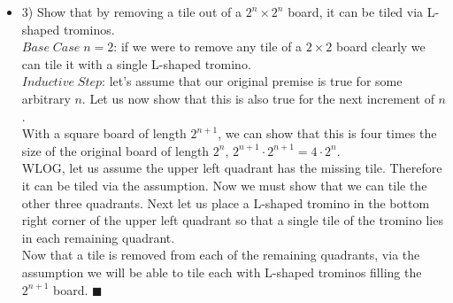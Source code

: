 \documentclass[ 12pt ]{article}
\begin{document}
\begin{itemize}
	\item[] {\large 3)}
	Show that by removing a tile out of a $2^n \times 2^n$ board, it can be tiled via L-shaped trominos. \\
	$Base\; Case\; n=2$: if we were to remove any tile of a $2 \times 2$ board clearly we can tile it with a single L-shaped tromino. \\
	$Inductive\; Step$: let's assume that our original premise is true for some arbitrary $n$. Let us now show that this is also true for the next increment of $n$. \\
	With a square board of length $2^{n+1}$, we can show that this is four times the size of the original board of length $2^n$, $2^{n+1} \cdot 2^{n+1} = 4 \cdot 2^n$. \\
	WLOG, let us assume the upper left quadrant has the missing tile. Therefore it can be tiled via the assumption. Now we must show that we can tile the other three quadrants.
	Next let us place a L-shaped tromino in the bottom right corner of the upper left quadrant so that a single tile of the tromino lies in each remaining quadrant. \\
	Now that a tile is removed from each of the remaining quadrants, via the assumption we will be able to tile each with L-shaped trominos filling the $2^{n+1}$ board. $\blacksquare$ \\


\end{itemize}
\end{document}
